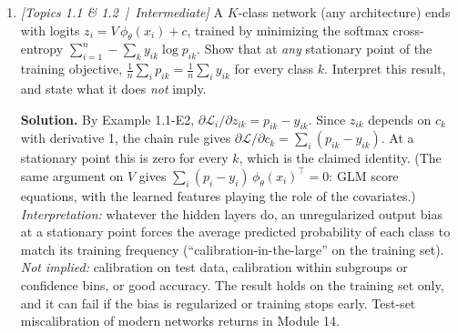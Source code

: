 \documentclass[11pt]{article}
\begin{document}
\begin{enumerate}[label=\textbf{Q\arabic*}, leftmargin=*]
  \item \textit{[Topics 1.1 \& 1.2 \,|\, Intermediate]} A $K$-class network (any architecture) ends with logits $z_i = V\,\phi_\theta(x_i) + c$, trained by minimizing the softmax cross-entropy $\sum_{i=1}^n -\sum_k y_{ik}\log p_{ik}$. Show that at \emph{any} stationary point of the training objective, $\frac1n\sum_i p_{ik} = \frac1n\sum_i y_{ik}$ for every class $k$. Interpret this result, and state what it does \emph{not} imply.

  \textbf{Solution.} By Example 1.1-E2, $\partial\mathcal L_i/\partial z_{ik} = p_{ik} - y_{ik}$. Since $z_{ik}$ depends on $c_k$ with derivative 1, the chain rule gives $\partial\mathcal L/\partial c_k = \sum_i (p_{ik} - y_{ik})$. At a stationary point this is zero for every $k$, which is the claimed identity. (The same argument on $V$ gives $\sum_i (p_i - y_i)\,\phi_\theta(x_i)^\top = 0$: GLM score equations, with the learned features playing the role of the covariates.) \emph{Interpretation:} whatever the hidden layers do, an unregularized output bias at a stationary point forces the average predicted probability of each class to match its training frequency (``calibration-in-the-large'' on the training set). \emph{Not implied:} calibration on test data, calibration within subgroups or confidence bins, or good accuracy. The result holds on the training set only, and it can fail if the bias is regularized or training stops early. Test-set miscalibration of modern networks returns in Module 14.
\end{enumerate}
\end{document}
